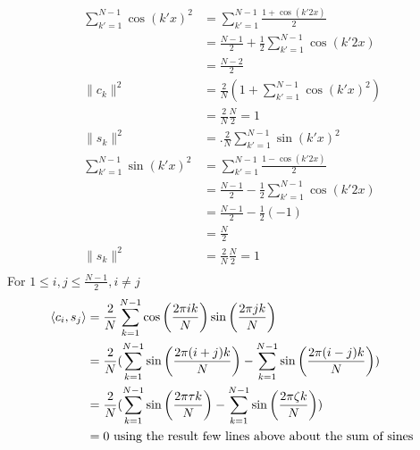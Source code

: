 \documentclass[12pt,twoside]{article}
\begin{document}
\begin{enumerate}
\begin{enumerate}
 \ \begin{align*}			
	  \sum_{k'=1}^{N-1} \cos(k' x)^2	&=    \sum_{k'=1}^{N-1}  \frac{1 + \cos(k' 2 x)} {2} \\
	  						&=	\frac{N-1}{2} + \frac{1}{2}  \sum_{k'=1}^{N-1}  \cos(k' 2 x) \\
							&=  	\frac{N-2}{2} \\
	\|c_k\|^2 					&= 	 \frac{2}{N} (1 +  \sum_{k'=1}^{N-1} \cos(k' x)^2) \\
							&=  	\frac{2}{N} \frac{N}{2} = 1 \\	
	\|s_k\|^2 					&=.  	\frac{2}{N} \sum_{k'=1}^{N-1} \sin (k' x)^2 \\
	 \sum_{k'=1}^{N-1} \sin (k' x)^2  &= 	 \sum_{k'=1}^{N-1}  \frac{1 - \cos(k' 2 x)} {2} \\	
	 						&=	 \frac{N-1}{2} -\frac{1}{2}  \sum_{k'=1}^{N-1}  \cos(k' 2 x) \\
							&= 	 \frac{N-1}{2} -\frac{1}{2} (-1) \\
							&= 	\frac{N}{2} \\
	\|s_k\|^2 					&= 	\frac{2}{N} \frac{N}{2}  = 1\\											
 \end{align*}
For $1 \leq i,j \leq \frac{N-1}{2}, i \neq j$
 \begin{align*}
 \left \langle c_i, s_j\right \rangle		&=	 \frac{2}{N}  \sum_{k=1}^{N-1} \cos \left( \frac{2 \pi i k }{N} \right) \sin \left( \frac{2 \pi j k }{N} \right) \\
 					&=	 \frac{2}{N}  ( \sum_{k=1}^{N-1}  \sin \left( \frac{2 \pi (i+j) k }{N} \right) - \sum_{k=1}^{N-1}  \sin \left( \frac{2 \pi (i-j) k }{N} \right)  )\\		
					&= 	 \frac{2}{N}   ( \sum_{k=1}^{N-1}  \sin \left( \frac{2 \pi \tau k }{N} \right) - \sum_{k=1}^{N-1}  \sin \left( \frac{2 \pi \zeta k }{N} \right)  )\\		
					&= 0 \text{ using the result few lines above about the sum of sines}
  \end{align*}
  

\end{enumerate}
\end{enumerate}
\end{document}
